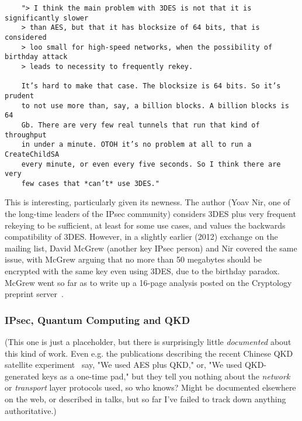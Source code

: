 \begin{widetext}
\begin{verbatim}
	"> I think the main problem with 3DES is not that it is significantly slower
	> than AES, but that it has blocksize of 64 bits, that is considered
	> loo small for high-speed networks, when the possibility of birthday attack
	> leads to necessity to frequently rekey.

	It’s hard to make that case. The blocksize is 64 bits. So it’s prudent
	to not use more than, say, a billion blocks. A billion blocks is 64
	Gb. There are very few real tunnels that run that kind of throughput
	in under a minute. OTOH it’s no problem at all to run a CreateChildSA
	every minute, or even every five seconds. So I think there are very
	few cases that *can’t* use 3DES."
\end{verbatim}
\end{widetext}

This is interesting, particularly given its newness.  The author (Yoav
Nir, one of the long-time leaders of the IPsec community) considers
3DES plus very frequent rekeying to be sufficient, at least for some
use cases, and values the backwards compatibility of 3DES.  However,
in a slightly earlier (2012) exchange on the mailing list, David
McGrew (another key IPsec person) and Nir covered the same issue, with
McGrew arguing that no more than 50 megabytes should be encrypted with
the same key even using 3DES, due to the birthday paradox.  McGrew
went so far as to write up a 16-page analysis posted on the Cryptology
preprint server~\cite{cryptoeprint:2012:623}.


\subsubsection{IPsec, Quantum Computing and QKD}




(This one is just a placeholder, but there is surprisingly little
\emph{documented} about this kind of work.  Even e.g. the publications
describing the recent Chinese QKD satellite
experiment~\cite{PhysRevLett.120.030501} say, "We used AES plus QKD,"
or, "We used QKD-generated keys as a one-time pad," but they tell you
nothing about the \emph{network} or \emph{transport} layer protocols
used, so who knows?  Might be documented elsewhere on the web, or
described in talks, but so far I've failed to track down anything
authoritative.)

